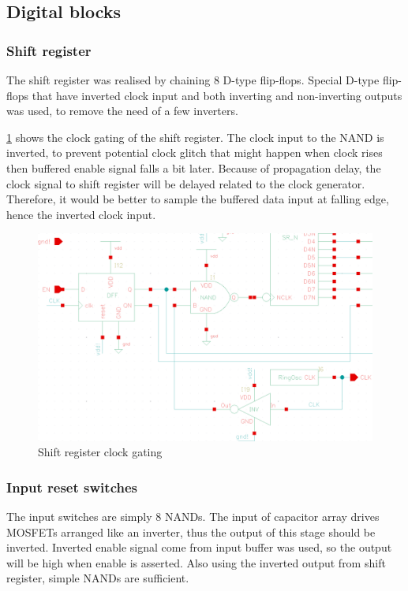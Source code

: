 \documentclass[journal]{IEEEtran}
\newcommand{\fref}[1]{\figurename \ref{#1}}
\begin{document}
\subsection{Digital blocks}

\subsubsection{Shift register}

The shift register was realised by chaining 8 D-type flip-flops. Special D-type flip-flops that have inverted clock input and both inverting and non-inverting outputs was used, to remove the need of a few inverters.

\fref{fig_clock} shows the clock gating of the shift register. The clock input to the NAND is inverted, to prevent potential clock glitch that might happen when clock rises then buffered enable signal falls a bit later. Because of propagation delay, the clock signal to shift register will be delayed related to the clock generator. Therefore, it would be better to sample the buffered data input at falling edge, hence the inverted clock input.

\begin{figure}[!t]
	\centering
	\includegraphics[width=\columnwidth]{clock}
	\caption{Shift register clock gating}
	\label{fig_clock}
\end{figure}

\subsubsection{Input reset switches}

The input switches are simply 8 NANDs. The input of capacitor array drives MOSFETs arranged like an inverter, thus the output of this stage should be inverted. Inverted enable signal come from input buffer was used, so the output will be high when enable is asserted. Also using the inverted output from shift register, simple NANDs are sufficient.
\end{document}

